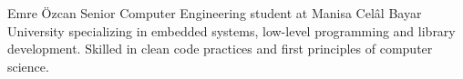 \documentclass[a4paper,journal]{IEEEtran}
\begin{document}
\ifCLASSOPTIONcaptionsoff
  \newpage
\fi





%
%
%

%

\begin{IEEEbiography}{Emre Özcan}
Senior Computer Engineering student at Manisa Celâl Bayar University
specializing in embedded systems, low-level programming and library development.
Skilled in clean code practices and first principles of computer science.
\end{IEEEbiography}
\end{document}
